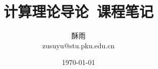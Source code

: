 \documentclass[8pt]{article}
\title{\heiti\zihao{1} 计算理论导论\ 课程笔记}
\author{\kaishu\zihao{-3} 酥雨\\zusuyu@stu.pku.edu.cn}
\date{\today}
\theoremstyle{compact}
\def\P{\textbf{P}}
\def\NP{\textbf{NP}}
\def\PSPACE{\textbf{PSPACE}}
\def\L{\textbf{L}}
\def\NL{\textbf{NL}}
\begin{document}
\pagestyle{plain}

\maketitle
\tableofcontents

\newpage
\end{document}
